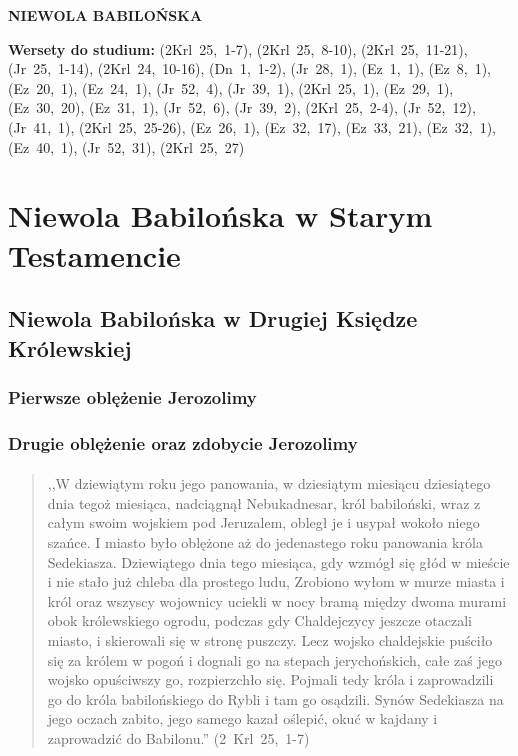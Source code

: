 \documentclass[10pt,a4paper,oneside]{article}
\begin{document}
\centerline{\textbf{\MakeUppercase{Niewola Babilońska}}}
\begin{center}
\textbf{Wersety do studium:} \mbox{(2Krl 25, 1-7)}, \mbox{(2Krl 25, 8-10)}, \mbox{(2Krl 25, 11-21)}, \mbox{(Jr 25, 1-14)}, \mbox{(2Krl 24, 10-16)}, \mbox{(Dn 1, 1-2)}, \mbox{(Jr 28, 1)}, \mbox{(Ez 1, 1)}, \mbox{(Ez 8, 1)}, \mbox{(Ez 20, 1)}, \mbox{(Ez 24, 1)}, \mbox{(Jr 52, 4)}, \mbox{(Jr 39, 1)}, \mbox{(2Krl 25, 1)}, \mbox{(Ez 29, 1)}, \mbox{(Ez 30, 20)}, \mbox{(Ez 31, 1)}, \mbox{(Jr 52, 6)}, \mbox{(Jr 39, 2)}, \mbox{(2Krl 25, 2-4)}, \mbox{(Jr 52, 12)}, \mbox{(Jr 41, 1)}, \mbox{(2Krl 25, 25-26)}, \mbox{(Ez 26, 1)}, \mbox{(Ez 32, 17)}, \mbox{(Ez 33, 21)}, \mbox{(Ez 32, 1)}, \mbox{(Ez 40, 1)}, \mbox{(Jr 52, 31)}, \mbox{(2Krl 25, 27)}
\end{center}
\section{Niewola Babilońska w Starym Testamencie}
\subsection{Niewola Babilońska w Drugiej Księdze Królewskiej}
\subsubsection{Pierwsze oblężenie Jerozolimy}
\subsubsection{Drugie oblężenie oraz zdobycie Jerozolimy}
\paragraph{}
\begin{quote}
,,W dziewiątym roku jego panowania, w dziesiątym miesiącu dziesiątego dnia tegoż miesiąca, nadciągnął Nebukadnesar, król babiloński, wraz z całym swoim wojskiem pod Jeruzalem, obległ je i usypał wokoło niego szańce. I miasto było oblężone aż do jedenastego roku panowania króla Sedekiasza. Dziewiątego dnia tego miesiąca, gdy wzmógł się głód w mieście i nie stało już chleba dla prostego ludu, Zrobiono wyłom w murze miasta i król oraz wszyscy wojownicy uciekli w nocy bramą między dwoma murami obok królewskiego ogrodu, podczas gdy Chaldejczycy jeszcze otaczali miasto, i skierowali się w stronę puszczy. Lecz wojsko chaldejskie puściło się za królem w pogoń i dognali go na stepach jerychońskich, całe zaś jego wojsko opuściwszy go, rozpierzchło się. Pojmali tedy króla i zaprowadzili go do króla babilońskiego do Rybli i tam go osądzili. Synów Sedekiasza na jego oczach zabito, jego samego kazał oślepić, okuć w kajdany i zaprowadzić do Babilonu.'' \mbox{(2 Krl 25, 1-7)}
\end{quote}
\end{document}
